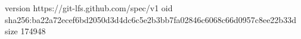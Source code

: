 version https://git-lfs.github.com/spec/v1
oid sha256:ba22a72ecef6bd2050d3d4dc6c5e2b3bb7fa02846c6068c66d0957c8ee22b33d
size 174948
